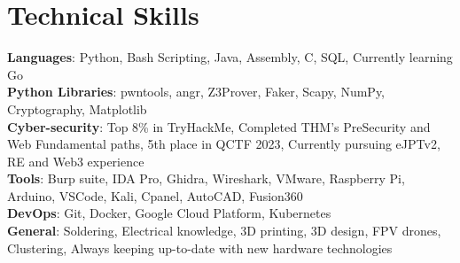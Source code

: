 \section{Technical Skills}

\begin{itemize}[leftmargin=0.15in, label={}]
    \small{\item{
        \textbf{Languages}{: Python, Bash Scripting, Java, Assembly, C, SQL, Currently learning Go} \\ \vspace{2mm}
        \textbf{Python Libraries}{: pwntools, angr, Z3Prover, Faker, Scapy, NumPy, Cryptography, Matplotlib} \\ \vspace{2mm}
        \textbf{Cyber-security}{: Top 8\% in TryHackMe, Completed THM's PreSecurity and Web Fundamental paths, 5th place in QCTF 2023, Currently pursuing eJPTv2, RE and Web3 experience} \\ \vspace{2mm}
        \textbf{Tools}{: Burp suite, IDA Pro, Ghidra, Wireshark, VMware, Raspberry Pi, Arduino, VSCode, Kali, Cpanel, AutoCAD, Fusion360} \\ \vspace{2mm}
        \textbf{DevOps}{: Git, Docker, Google Cloud Platform, Kubernetes}\\ \vspace{2mm}
        \textbf{General}{: Soldering, Electrical knowledge, 3D printing, 3D design, FPV drones, Clustering, Always keeping up-to-date with new hardware technologies}\\

    }}
\end{itemize}